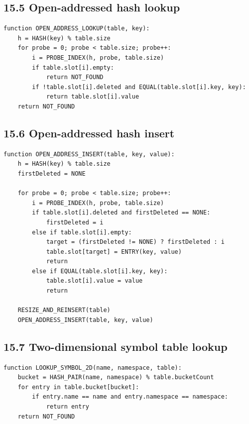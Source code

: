\documentclass[10pt,letterpaper]{article}
\begin{document}
\subsection*{15.5 Open-addressed hash lookup}
{}

\begin{verbatim}
function OPEN_ADDRESS_LOOKUP(table, key):
    h = HASH(key) % table.size
    for probe = 0; probe < table.size; probe++:
        i = PROBE_INDEX(h, probe, table.size)
        if table.slot[i].empty:
            return NOT_FOUND
        if !table.slot[i].deleted and EQUAL(table.slot[i].key, key):
            return table.slot[i].value
    return NOT_FOUND
\end{verbatim}

\subsection*{15.6 Open-addressed hash insert}
{}

\begin{verbatim}
function OPEN_ADDRESS_INSERT(table, key, value):
    h = HASH(key) % table.size
    firstDeleted = NONE

    for probe = 0; probe < table.size; probe++:
        i = PROBE_INDEX(h, probe, table.size)
        if table.slot[i].deleted and firstDeleted == NONE:
            firstDeleted = i
        else if table.slot[i].empty:
            target = (firstDeleted != NONE) ? firstDeleted : i
            table.slot[target] = ENTRY(key, value)
            return
        else if EQUAL(table.slot[i].key, key):
            table.slot[i].value = value
            return

    RESIZE_AND_REINSERT(table)
    OPEN_ADDRESS_INSERT(table, key, value)
\end{verbatim}

\subsection*{15.7 Two-dimensional symbol table lookup}
{}

\begin{verbatim}
function LOOKUP_SYMBOL_2D(name, namespace, table):
    bucket = HASH_PAIR(name, namespace) % table.bucketCount
    for entry in table.bucket[bucket]:
        if entry.name == name and entry.namespace == namespace:
            return entry
    return NOT_FOUND
\end{verbatim}
\end{document}
